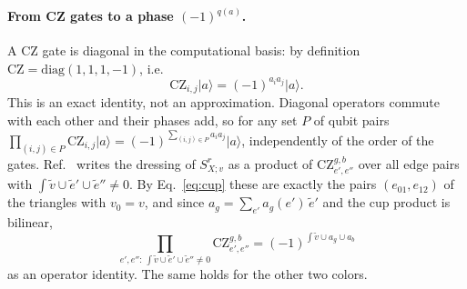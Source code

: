 \documentclass[a4paper]{article}
\newcommand{\rd}{r}
\newcommand{\gr}{g}
\newcommand{\bl}{b}
\providecommand{\ket}[1]{\ensuremath{|#1\rangle}}
\begin{document}
\paragraph{From CZ gates to a phase $(-1)^{q(a)}$.}
A CZ gate is diagonal in the computational basis: by definition $\mathrm{CZ}=\mathrm{diag}(1,1,1,-1)$, i.e.
\begin{equation}
  \mathrm{CZ}_{i,j}\ket{a}=(-1)^{a_ia_j}\ket{a}.
  \label{eq:cz}
\end{equation}
This is an exact identity, not an approximation. Diagonal operators commute with each other and their phases add, so for any set $P$ of qubit pairs $\prod_{(i,j)\in P}\mathrm{CZ}_{i,j}\ket{a}=(-1)^{\sum_{(i,j)\in P}a_ia_j}\ket{a}$, independently of the order of the gates. Ref.~\cite{kobayashi2025clifford} writes the dressing of $S^\rd_{X;v}$ as a product of $\mathrm{CZ}^{\gr,\bl}_{e',e''}$ over all edge pairs with $\int\tilde v\cup\tilde e'\cup\tilde e''\neq0$. By Eq.~\eqref{eq:cup} these are exactly the pairs $(e_{01},e_{12})$ of the triangles with $v_0=v$, and since $a_\gr=\sum_{e'}a_\gr(e')\,\tilde e'$ and the cup product is bilinear,
\begin{equation}
  \prod_{e',e'':\,\int\tilde v\cup\tilde e'\cup\tilde e''\neq0}\mathrm{CZ}^{\gr,\bl}_{e',e''}
  =(-1)^{\int\tilde v\cup a_\gr\cup a_\bl}
  \label{eq:czcup}
\end{equation}
as an operator identity. The same holds for the other two colors.
\end{document}
